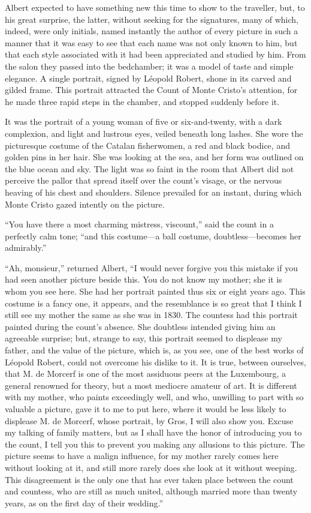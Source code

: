 Albert expected to have something new this time to show to the
traveller, but, to his great surprise, the latter, without seeking for
the signatures, many of which, indeed, were only initials, named
instantly the author of every picture in such a manner that it was easy
to see that each name was not only known to him, but that each style
associated with it had been appreciated and studied by him. From the
salon they passed into the bedchamber; it was a model of taste and
simple elegance. A single portrait, signed by Léopold Robert, shone in
its carved and gilded frame. This portrait attracted the Count of Monte
Cristo’s attention, for he made three rapid steps in the chamber, and
stopped suddenly before it.

It was the portrait of a young woman of five or six-and-twenty, with a
dark complexion, and light and lustrous eyes, veiled beneath long
lashes. She wore the picturesque costume of the Catalan fisherwomen, a
red and black bodice, and golden pins in her hair. She was looking at
the sea, and her form was outlined on the blue ocean and sky. The light
was so faint in the room that Albert did not perceive the pallor that
spread itself over the count’s visage, or the nervous heaving of his
chest and shoulders. Silence prevailed for an instant, during which
Monte Cristo gazed intently on the picture.

“You have there a most charming mistress, viscount,” said the count in
a perfectly calm tone; “and this costume—a ball costume,
doubtless—becomes her admirably.”

“Ah, monsieur,” returned Albert, “I would never forgive you this
mistake if you had seen another picture beside this. You do not know my
mother; she it is whom you see here. She had her portrait painted thus
six or eight years ago. This costume is a fancy one, it appears, and
the resemblance is so great that I think I still see my mother the same
as she was in 1830. The countess had this portrait painted during the
count’s absence. She doubtless intended giving him an agreeable
surprise; but, strange to say, this portrait seemed to displease my
father, and the value of the picture, which is, as you see, one of the
best works of Léopold Robert, could not overcome his dislike to it. It
is true, between ourselves, that M. de Morcerf is one of the most
assiduous peers at the Luxembourg, a general renowned for theory, but a
most mediocre amateur of art. It is different with my mother, who
paints exceedingly well, and who, unwilling to part with so valuable a
picture, gave it to me to put here, where it would be less likely to
displease M. de Morcerf, whose portrait, by Gros, I will also show you.
Excuse my talking of family matters, but as I shall have the honor of
introducing you to the count, I tell you this to prevent you making any
allusions to this picture. The picture seems to have a malign
influence, for my mother rarely comes here without looking at it, and
still more rarely does she look at it without weeping. This
disagreement is the only one that has ever taken place between the
count and countess, who are still as much united, although married more
than twenty years, as on the first day of their wedding.”

